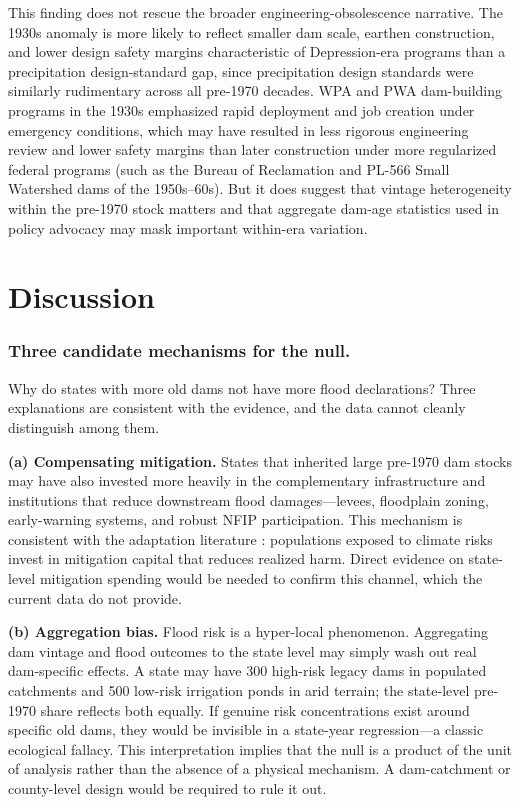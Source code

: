 \documentclass[12pt]{article}
\begin{document}
This finding does not rescue the broader engineering-obsolescence narrative. The 1930s anomaly is more likely to reflect smaller dam scale, earthen construction, and lower design safety margins characteristic of Depression-era programs than a precipitation design-standard gap, since precipitation design standards were similarly rudimentary across all pre-1970 decades. WPA and PWA dam-building programs in the 1930s emphasized rapid deployment and job creation under emergency conditions, which may have resulted in less rigorous engineering review and lower safety margins than later construction under more regularized federal programs (such as the Bureau of Reclamation and PL-566 Small Watershed dams of the 1950s–60s). But it does suggest that vintage heterogeneity within the pre-1970 stock matters and that aggregate dam-age statistics used in policy advocacy may mask important within-era variation.



\section{Discussion}

\subsubsection*{Three candidate mechanisms for the null.}

Why do states with more old dams not have more flood declarations? Three explanations are consistent with the evidence, and the data cannot cleanly distinguish among them.

\textbf{(a) Compensating mitigation.} States that inherited large pre-1970 dam stocks may have also invested more heavily in the complementary infrastructure and institutions that reduce downstream flood damages---levees, floodplain zoning, early-warning systems, and robust NFIP participation. This mechanism is consistent with the adaptation literature \citep{barreca2016,burke2015}: populations exposed to climate risks invest in mitigation capital that reduces realized harm. Direct evidence on state-level mitigation spending would be needed to confirm this channel, which the current data do not provide.

\textbf{(b) Aggregation bias.} Flood risk is a hyper-local phenomenon. Aggregating dam vintage and flood outcomes to the state level may simply wash out real dam-specific effects. A state may have 300 high-risk legacy dams in populated catchments and 500 low-risk irrigation ponds in arid terrain; the state-level pre-1970 share reflects both equally. If genuine risk concentrations exist around specific old dams, they would be invisible in a state-year regression---a classic ecological fallacy. This interpretation implies that the null is a product of the unit of analysis rather than the absence of a physical mechanism. A dam-catchment or county-level design would be required to rule it out.
\end{document}
